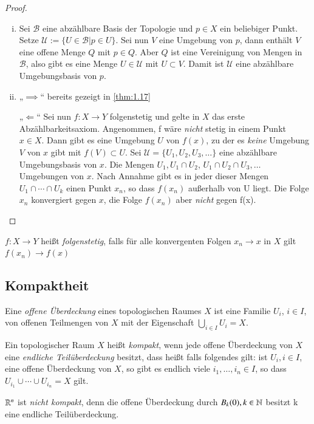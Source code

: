 \documentclass[a4paper,10pt]{scrartcl}
\begin{document}
\begin{proof}
 \begin{enumerate}[(i)]
  \item Sei $\mathcal B$ eine abzählbare Basis der Topologie und $p\in X$ ein beliebiger Punkt. Setze $\mathcal U:=\{U\in \mathcal{B} |p\in U\}$. Sei nun $V$ eine Umgebung von $p$, dann enthält $V$ eine offene Menge $Q$ mit $p\in Q$. Aber $Q$ ist eine Vereinigung von Mengen in $\mathcal B$, also gibt es eine Menge $U\in \mathcal U$ mit  $U \subset V$. Damit ist $ \mathcal U $ eine abzählbare Umgebungsbasis von $p$.
\item \begin{seg}{„$\implies$“} bereits gezeigt in \ref{thm:1.17} \end{seg}

\begin{seg}{„$\Longleftarrow$“} Sei nun $f:X\to Y$ folgenstetig und gelte in $X$ das erste Abzählbarkeitsaxiom. Angenommen, f wäre \emph{nicht} stetig in einem Punkt $x\in X$. Dann gibt es eine Umgebung $U$ von $f(x)$, zu der es \emph{keine} Umgebung $V$ von $x$ gibt mit $f(V)\subset U$. Sei $\mathcal U=\{U_1,U_2,U_3,\dotsc  \}$ eine abzählbare Umgebungsbasis von $x$. Die Mengen $U_1, U_1\cap U_2$, $U_1\cap U_2 \cap U_3,\dotsc  $ Umgebungen von $x$. Nach Annahme gibt es in jeder dieser Mengen $U_1\cap\dotsb \cap U_k$ einen Punkt $x_n$, so dass $f(x_n)$ außerhalb von U liegt. Die Folge $x_n$ konvergiert gegen $x$, die Folge $f(x_n)$ aber \emph{nicht} gegen f(x).
\end{seg}
\end{enumerate}
\end{proof}
\begin{note}
 $f: X\to Y$ heißt \emph{folgenstetig}, falls für alle konvergenten Folgen $x_n\to x$ in $X$ gilt $f(x_n)\to f(x)$ 
\end{note}
\subsection{Kompaktheit}
\begin{df}\label{thm:6.1}
 Eine \emph{offene Überdeckung} eines topologischen Raumes $X$ ist eine Familie $U_i$, $i\in I$, von offenen Teilmengen von $X$ mit der Eigenschaft $\bigcup_{i\in I} U_i=X$.
\end{df}
\begin{df}\label{thm:6.2}
 Ein topologischer Raum $X$ heißt \emph{kompakt}, wenn jede offene Überdeckung von $X$ eine \emph{endliche Teilüberdeckung} besitzt, dass heißt falls folgendes gilt: ist $U_i, i\in I$, eine offene Überdeckung von $X$, so gibt es endlich viele $i_1, \dotsc  ,i_n\in I$, so dass $U_{i_1}\cup \dotsb \cup U_{i_n}=X$ gilt.
\end{df}
\begin{ex*}
 $\mathbb{R}^n$ ist \emph{nicht kompakt}, denn die offene Überdeckung durch $B_k(0),k\in \mathbb{N}$ besitzt k          eine endliche Teilüberdeckung.
\end{ex*}
\end{document}
